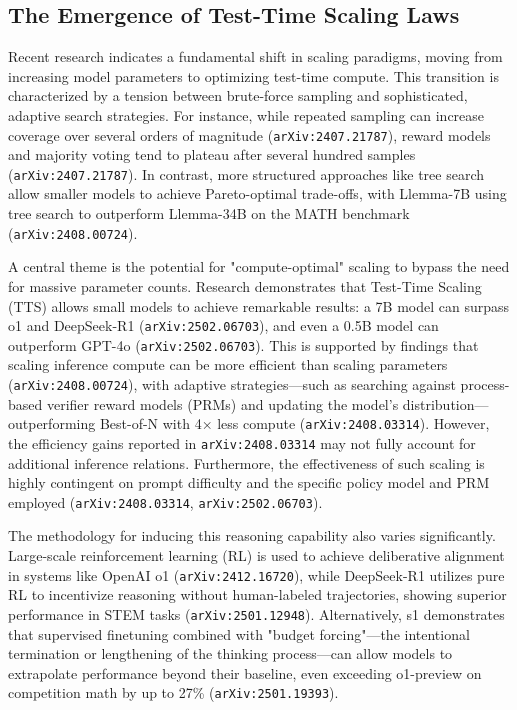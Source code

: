 \documentclass[11pt]{article}
\begin{document}
\subsection{The Emergence of Test-Time Scaling Laws}

Recent research indicates a fundamental shift in scaling paradigms, moving from increasing model parameters to optimizing test-time compute. This transition is characterized by a tension between brute-force sampling and sophisticated, adaptive search strategies. For instance, while repeated sampling can increase coverage over several orders of magnitude (\texttt{arXiv:2407.21787}), reward models and majority voting tend to plateau after several hundred samples (\texttt{arXiv:2407.21787}). In contrast, more structured approaches like tree search allow smaller models to achieve Pareto-optimal trade-offs, with Llemma-7B using tree search to outperform Llemma-34B on the MATH benchmark (\texttt{arXiv:2408.00724}).

A central theme is the potential for "compute-optimal" scaling to bypass the need for massive parameter counts. Research demonstrates that Test-Time Scaling (TTS) allows small models to achieve remarkable results: a 7B model can surpass o1 and DeepSeek-R1 (\texttt{arXiv:2502.06703}), and even a 0.5B model can outperform GPT-4o (\texttt{arXiv:2502.06703}). This is supported by findings that scaling inference compute can be more efficient than scaling parameters (\texttt{arXiv:2408.00724}), with adaptive strategies—such as searching against process-based verifier reward models (PRMs) and updating the model's distribution—outperforming Best-of-N with 4× less compute (\texttt{arXiv:2408.03314}). However, the efficiency gains reported in \texttt{arXiv:2408.03314} may not fully account for additional inference relations. Furthermore, the effectiveness of such scaling is highly contingent on prompt difficulty and the specific policy model and PRM employed (\texttt{arXiv:2408.03314}, \texttt{arXiv:2502.06703}).

The methodology for inducing this reasoning capability also varies significantly. Large-scale reinforcement learning (RL) is used to achieve deliberative alignment in systems like OpenAI o1 (\texttt{arXiv:2412.16720}), while DeepSeek-R1 utilizes pure RL to incentivize reasoning without human-labeled trajectories, showing superior performance in STEM tasks (\texttt{arXiv:2501.12948}). Alternatively, s1 demonstrates that supervised finetuning combined with "budget forcing"—the intentional termination or lengthening of the thinking process—can allow models to extrapolate performance beyond their baseline, even exceeding o1-preview on competition math by up to 27\% (\texttt{arXiv:2501.19393}).
\end{document}
